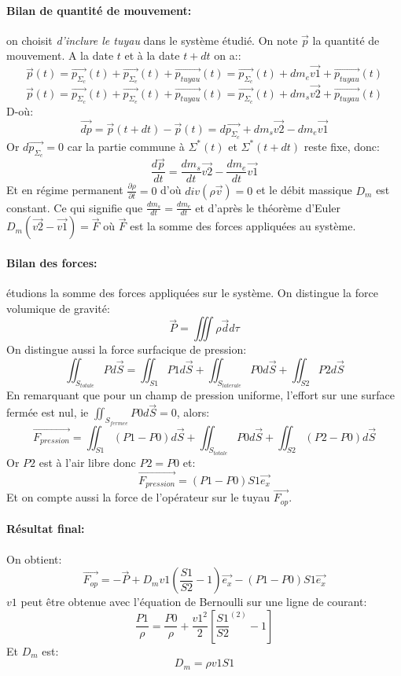 \documentclass[10pt,a4paper]{article}
\begin{document}
\paragraph{Bilan de quantité de mouvement:} on choisit \textit{d'inclure le tuyau }dans le système étudié. On note $\vec{p}$ la quantité de mouvement. A la date $t$ et à la date $t+dt$ on a::
\[\vec{p}(t) = \vec{p_{\Sigma_{c}}}(t) + \vec{p_{\Sigma_{e}}}(t) +  \vec{p_{tuyau}}(t) = \vec{p_{\Sigma_{c}}}(t) + dm_{e}\vec{v1} +  \vec{p_{tuyau}}(t)\]
\[\vec{p}(t) = \vec{p_{\Sigma_{c}}}(t) + \vec{p_{\Sigma_{e}}}(t) +  \vec{p_{tuyau}}(t) = \vec{p_{\Sigma_{c}}}(t) + dm_{s}\vec{v2} +  \vec{p_{tuyau}}(t)\]
D-où:
\[ \vec{dp} = \vec{p}(t+dt) - \vec{p}(t) = d\vec{p_{\Sigma_{c}}} + dm_{s}\vec{v2} - dm_{e}\vec{v1} \]
Or $d\vec{p_{\Sigma_{c}}} = 0$ car la partie commune à $\Sigma^{*}(t)$ et $\Sigma^{*}(t+dt)$ reste fixe, donc:
\[ \frac{d\vec{p}}{dt} = \frac{dm_{s}}{dt}\vec{v2} - \frac{dm_{e}}{dt}\vec{v1}\]
Et en régime permanent $\frac{\partial \rho}{\partial t} = 0$ d'où $div(\rho\vec{v}) = 0$ et le débit massique $D_{m}$ est constant. Ce qui signifie que $\frac{dm_{s}}{dt} = \frac{dm_{e}}{dt}$ et d'après le théorème d'Euler $D_{m}(\vec{v2}-\vec{v1}) = \vec{F}$ où $\vec{F}$ est la somme des forces appliquées au système.

\paragraph{Bilan des forces:} étudions la somme des forces appliquées sur le système. On distingue la force volumique de gravité:
\[ \vec{P} = \iiint \rho\vec{d} d\tau\]
On distingue aussi la force surfacique de pression:
\[\iint_{S_{totale}}Pd\vec{S} = \iint_{S1}P1d\vec{S} + \iint_{S_{laterale}}P0d\vec{S} + \iint_{S2}P2d\vec{S}\]
En remarquant que pour un champ de pression uniforme, l'effort sur une surface fermée est nul, ie $\iint_{S_{fermee}}P0d\vec{S} = 0$, alors:
\[\vec{F_{pression}} = \iint_{S1}(P1-P0)d\vec{S} + \iint_{S_{totale}}P0d\vec{S} + \iint_{S2}(P2-P0)d\vec{S}\]
Or $P2$ est à l'air libre donc $P2=P0$ et:
\[\vec{F_{pression}} = (P1-P0)S1 \vec{e_{x}}\]
Et on compte aussi la force de l'opérateur sur le tuyau $\vec{F_{op}}$.

\paragraph{Résultat final:}
On obtient:
\[\vec{F_{op}} = -\vec{P} + D_{m}v1(\frac{S1}{S2} - 1)\vec{e_{x}} - (P1-P0)S1\vec{e_{x}}\]
$v1$ peut être obtenue avec l'équation de Bernoulli sur une ligne de courant:
\[\frac{P1}{\rho} = \frac{P0}{\rho} + \frac{v1^{2}}{2}[\frac{S1}{S2}^(2) - 1]\]
Et $D_{m}$ est:
\[ D_{m} = \rho v1 S1 \]
\end{document}
